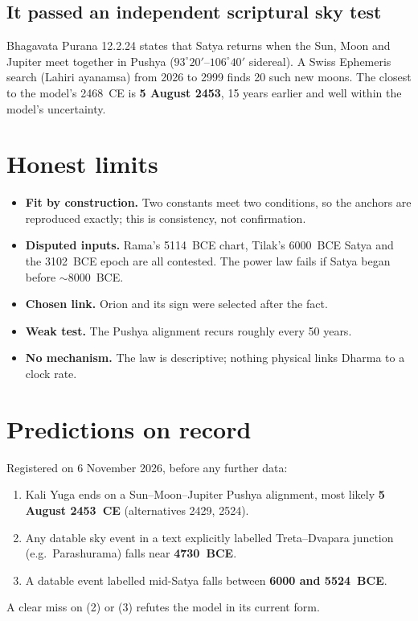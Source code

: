 \documentclass[11pt,a4paper]{article}
\begin{document}
\subsection{It passed an independent scriptural sky test}
Bhagavata Purana 12.2.24 states that Satya returns when the Sun, Moon and Jupiter meet together in Pushya ($93^\circ20'$--$106^\circ40'$ sidereal). A Swiss Ephemeris search (Lahiri ayanamsa) from 2026 to 2999 finds 20 such new moons. The closest to the model's 2468~CE is \textbf{5 August 2453}, 15 years earlier and well within the model's uncertainty.

\section{Honest limits}
\begin{itemize}[leftmargin=*]
\item \textbf{Fit by construction.} Two constants meet two conditions, so the anchors are reproduced exactly; this is consistency, not confirmation.
\item \textbf{Disputed inputs.} Rama's 5114~BCE chart, Tilak's 6000~BCE Satya and the 3102~BCE epoch are all contested. The power law fails if Satya began before $\sim$8000~BCE.
\item \textbf{Chosen link.} Orion and its sign were selected after the fact.
\item \textbf{Weak test.} The Pushya alignment recurs roughly every 50 years.
\item \textbf{No mechanism.} The law is descriptive; nothing physical links Dharma to a clock rate.
\end{itemize}

\newpage
\section{Predictions on record}
Registered on 6 November 2026, before any further data:
\begin{enumerate}[leftmargin=*]
\item Kali Yuga ends on a Sun--Moon--Jupiter Pushya alignment, most likely \textbf{5 August 2453~CE} (alternatives 2429, 2524).
\item Any datable sky event in a text explicitly labelled Treta--Dvapara junction (e.g.\ Parashurama) falls near \textbf{4730~BCE}.
\item A datable event labelled mid-Satya falls between \textbf{6000 and 5524~BCE}.
\end{enumerate}
A clear miss on (2) or (3) refutes the model in its current form.
\end{document}
